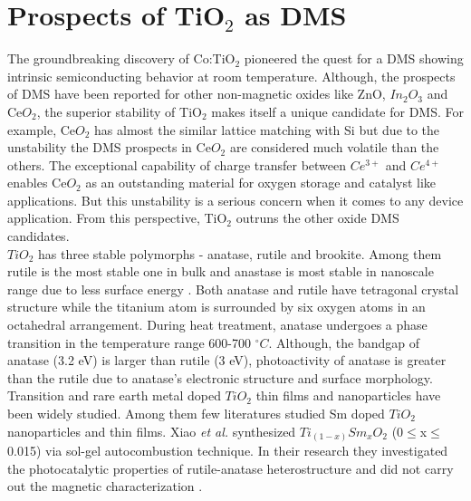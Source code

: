 \documentclass[main.tex]{subfiles}
\begin{document}
\section{Prospects of TiO$_{2}$ as DMS}

The groundbreaking discovery of Co:TiO$_{2}$ pioneered the quest for a DMS showing intrinsic semiconducting behavior at room temperature. Although, the prospects of DMS have been reported for other non-magnetic oxides like ZnO, $In_{2}O_{3}$ and Ce$O_2$, the superior stability of TiO$_{2}$ makes itself a unique candidate for DMS. For example, Ce$O_2$ has almost the similar lattice matching with Si but due to the unstability the DMS prospects in Ce$O_2$ are considered much volatile than the others. The exceptional capability of charge transfer between $Ce^{3+}$ and $Ce^{4+}$ enables Ce$O_2$ as an outstanding material for oxygen storage and catalyst like applications. But this unstability is a serious concern when it comes to any device application. From this perspective, TiO$_{2}$ outruns the other oxide DMS candidates. \\

$TiO_{2}$ has three stable polymorphs - anatase, rutile and brookite. Among them rutile is the most stable one in bulk and anastase is most stable in nanoscale range due to less surface energy \cite{satoh2013metastability}. Both anatase and rutile have tetragonal crystal structure while the titanium atom is surrounded by six oxygen atoms in an octahedral arrangement. During heat treatment, anatase undergoes a phase transition in the temperature range 600-700 $^{\circ}C$. Although, the bandgap of anatase (3.2 eV) is larger than rutile (3 eV), photoactivity of anatase is greater than the rutile due to anatase's electronic structure and surface morphology. \\

Transition and rare earth metal doped $TiO_{2}$ thin films and nanoparticles have been widely studied. Among them few literatures studied Sm doped $TiO_{2}$ nanoparticles and thin films. Xiao \textit{et al.} synthesized $Ti_{(1-x)}Sm_{x}O_{2}$ (0$\leq$x$\leq$0.015) via sol-gel autocombustion technique. In their research they investigated the photocatalytic properties of rutile-anatase heterostructure and did not carry out the magnetic characterization \cite{xiao2007sol}. 
\end{document}
